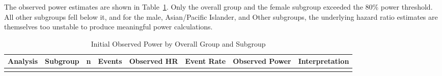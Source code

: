 \documentclass[
  letterpaper,
  DIV=11,
  numbers=noendperiod]{scrartcl}
\begin{document}
The observed power estimates are shown in
Table~\ref{tbl-observed-power}. Only the overall group and the female
subgroup exceeded the 80\% power threshold. All other subgroups fell
below it, and for the male, Asian/Pacific Islander, and Other subgroups,
the underlying hazard ratio estimates are themselves too unstable to
produce meaningful power calculations.

\begin{longtable}[]{@{}
  >{\raggedright\arraybackslash}p{}
  >{\raggedright\arraybackslash}p{}
  >{\raggedleft\arraybackslash}p{}
  >{\raggedleft\arraybackslash}p{}
  >{\raggedleft\arraybackslash}p{}
  >{\raggedleft\arraybackslash}p{}
  >{\raggedleft\arraybackslash}p{}
  >{\raggedright\arraybackslash}p{}@{}}
\caption{Initial Observed Power by Overall Group and
Subgroup}\label{tbl-observed-power}\tabularnewline
\toprule\noalign{}
\begin{minipage}[b]{\linewidth}\raggedright
Analysis
\end{minipage} & \begin{minipage}[b]{\linewidth}\raggedright
Subgroup
\end{minipage} & \begin{minipage}[b]{\linewidth}\raggedleft
n
\end{minipage} & \begin{minipage}[b]{\linewidth}\raggedleft
Events
\end{minipage} & \begin{minipage}[b]{\linewidth}\raggedleft
Observed HR
\end{minipage} & \begin{minipage}[b]{\linewidth}\raggedleft
Event Rate
\end{minipage} & \begin{minipage}[b]{\linewidth}\raggedleft
Observed Power
\end{minipage} & \begin{minipage}[b]{\linewidth}\raggedright
Interpretation
\end{minipage} \\
\midrule\noalign{}
\endfirsthead
\toprule\noalign{}
\begin{minipage}[b]{\linewidth}\raggedright

\end{minipage}
\end{longtable}
\end{document}
